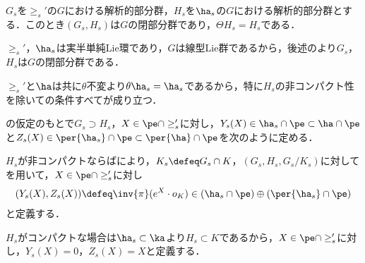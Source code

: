 \begin{lem}\label{lem:0117-closed}
  $G_s $を$\ge_{s}' $の$G$における解析的部分群，$H_s $を$\ha_s $の$G$における解析的部分群とする．このとき$(G_s, H_s) $は$G$の閉部分群であり，$\Theta H_s = H_s $である．
\end{lem}
\begin{npfwn}
  $\ge_s' $，$\ha_s $は実半単純Lie環であり，$G$は線型Lie群であるから，後述のより$G_s$，$H_s$は$G$の閉部分群である．

  $\ge_{s}'$と$\ha $は共に$\theta$不変より$\theta \ha_s = \ha_s $であるから，特に$H_s$の非コンパクト性を除いての条件すべてが成り立つ．
\end{npfwn}

\begin{defi}

  の仮定のもとで$G_s\supset H_s$，$X\in \pe\cap\ge_{s}' $に対し，$Y_s(X)\in \ha_s\cap\pe \subset \ha\cap \pe $と$Z_s(X)\in \per{\ha_s}\cap \pe \subset \per{\ha}\cap \pe $を次のように定める．
  
  $H_s $が非コンパクトならばにより，$K_s\defeq G_s\cap K $，$(G_s, H_s, G_s/K_s) $に対してを用いて，$X\in \pe\cap\ge_{s}' $に対し
  \begin{align*}
    {(Y_s(X), Z_s(X))\defeq \inv{\pi}(e^X\cdot o_K)\in (\ha_s\cap\pe)\oplus (\per{\ha_s}\cap \pe)}
  \end{align*}
  と定義する．


  $H_s $がコンパクトな場合は$\ha_s\subset \ka $より$H_s\subset K $であるから，$X\in \pe\cap\ge_{s}' $に対し，$Y_s(X) = 0 $，$Z_s(X) = X $と定義する．
\end{defi}

